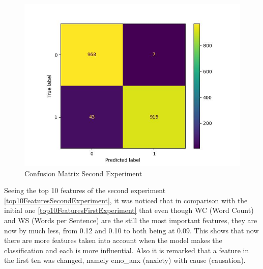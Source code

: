 \begin{figure}[htbp]
	\centering
		\includegraphics[scale=0.8]{LaTeX Bachelor Thesis Depression Signs Detection/figures/metrics/experiment2English/confusionMatrix.jpg}
	\caption{Confusion Matrix Second Experiment}
	\label{confusionMatriSecondExperiment}
\end{figure}



Seeing the top 10 features of the second experiment \ref{top10FeaturesSecondExperiment}, it was noticed that in comparison with the initial one \ref{top10FeaturesFirstExperiment} that even though WC (Word Count) and WS (Words per Sentence) are the still the most important features, they are now by much less, from 0.12 and 0.10 to both being at 0.09. This shows that now there are more features taken into account when the model makes the classification and each is more influential. Also it is remarked that a feature in the first ten was changed, namely emo\_anx (anxiety) with cause (causation).

